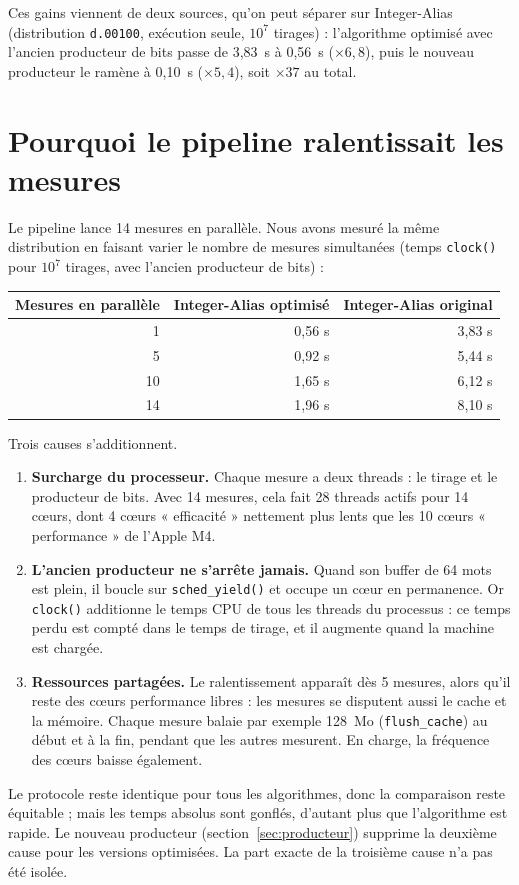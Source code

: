 \documentclass[11pt,a4paper]{article}
\newcommand{\code}[1]{\texttt{#1}}
\begin{document}
Ces gains viennent de deux sources, qu'on peut séparer sur Integer-Alias
(distribution \code{d.00100}, exécution seule, $10^7$ tirages) :
l'algorithme optimisé avec l'ancien producteur de bits passe de 3,83~s à 0,56~s
($\times 6{,}8$), puis le nouveau producteur le ramène à 0,10~s ($\times 5{,}4$),
soit $\times 37$ au total.

\section{Pourquoi le pipeline ralentissait les mesures}
\label{sec:pipeline}

Le pipeline lance 14 mesures en parallèle. Nous avons mesuré la même distribution en
faisant varier le nombre de mesures simultanées (temps \code{clock()} pour
$10^7$ tirages, avec l'ancien producteur de bits) :

\begin{table}[H]
\centering
\small
\begin{tabular}{rrr}
\toprule
Mesures en parallèle & Integer-Alias optimisé & Integer-Alias original \\
\midrule
1  & 0,56 s & 3,83 s \\
5  & 0,92 s & 5,44 s \\
10 & 1,65 s & 6,12 s \\
14 & 1,96 s & 8,10 s \\
\bottomrule
\end{tabular}
\end{table}

\noindent Trois causes s'additionnent.
\begin{enumerate}
\item \textbf{Surcharge du processeur.} Chaque mesure a deux threads : le tirage et le
  producteur de bits. Avec 14 mesures, cela fait 28 threads actifs pour 14 cœurs,
  dont 4 cœurs « efficacité » nettement plus lents que les 10 cœurs « performance »
  de l'Apple M4.
\item \textbf{L'ancien producteur ne s'arrête jamais.} Quand son buffer de 64 mots est
  plein, il boucle sur \code{sched\_yield()} et occupe un cœur en permanence. Or
  \code{clock()} additionne le temps CPU de tous les threads du processus : ce temps
  perdu est compté dans le temps de tirage, et il augmente quand la machine est chargée.
\item \textbf{Ressources partagées.} Le ralentissement apparaît dès 5 mesures, alors
  qu'il reste des cœurs performance libres : les mesures se disputent aussi le cache
  et la mémoire. Chaque mesure balaie par exemple 128~Mo (\code{flush\_cache}) au
  début et à la fin, pendant que les autres mesurent. En charge, la fréquence des
  cœurs baisse également.
\end{enumerate}
Le protocole reste identique pour tous les algorithmes, donc la comparaison reste
équitable ; mais les temps absolus sont gonflés, d'autant plus que l'algorithme est
rapide. Le nouveau producteur (section~\ref{sec:producteur}) supprime la deuxième
cause pour les versions optimisées. La part exacte de la troisième cause n'a pas été
isolée.
\end{document}
